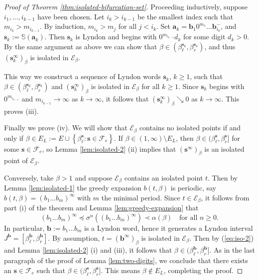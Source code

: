 \documentclass[12pt]{amsart}
\theoremstyle{definition}
\theoremstyle{remark}
\numberwithin{equation}{section}
\renewcommand{\S}{\ensuremath{\mathbb{S}}}
\renewcommand{\a}{ {\mathbf{a}}}
\renewcommand{\b}{ {\mathbf{b}}}
\newcommand{\s}{ {\mathbf{s}}}
\newcommand{\E}{\mathscr{E}}
\newcommand{\set}[1]{\left\{#1\right\}}
\newcommand{\f}{\infty}
\newcommand{\al}{\alpha}
\newcommand{\lle}{\preccurlyeq}
\renewcommand{\a}{ \mathbf{a}}
\newcommand{\si}{\sigma}
\begin{document}
{\begin{proof}[Proof of Theorem \ref{thm:isolated-bifurcation-set}]
Proceeding inductively, suppose $i_1,\dots,i_{k-1}$ have been chosen. Let $i_k>i_{k-1}$ be the smallest index such that $m_{i_k}>m_{i_{k-1}}$. By induction, $m_{i_k}>m_j$ for all $j<i_k$. Set $\a_k=\b_1 0^{m_1}\ldots \b_{i_k}^-$, and $\s_k:=\S(\a_k)$. Then $\s_k$ is Lyndon and begins with $0^{m_{i_{k-1}}}d_k$ for some digit $d_k>0$. By the same argument as above we can show that $\beta\in(\beta_\ell^{\s_k}, \beta_r^{\s_k})$, and thus $(\s_k^\f)_\beta$ is isolated in $\E_\beta$.

This way we construct a sequence of Lyndon words $\s_k$, $k\ge 1$, such that $\beta\in(\beta_\ell^{\s_k}, \beta_r^{\s_k})$ and $(\s_k^\f)_\beta$ is isolated in $\E_\beta$ for all $k\ge 1$. Since $\s_k$ begins with $0^{m_{i_{k-1}}}$ and $m_{i_{k-1}}\to\f$ as $k\to\f$, it follows that $(\s_k^\f)_\beta\searrow 0$ as $k\to\f$. This proves (iii).

Finally we prove (iv). We will show that ${\E_\beta}$ contains no isolated points if and only if $\beta\in E_L:=E\cup\set{\beta_\ell^\s: \s\in\mathcal F_e}$.
If $\beta\in(1,\f)\setminus E_L$, then $\beta\in(\beta_\ell^\s,\beta_r^\s]$ for some $\s\in\mathcal F_e$, so Lemma \ref{lem:isolated-2} (ii) implies that $(\s^\f)_\beta$ is an isolated point of $\E_\beta$. 

Conversely, take $\beta>1$ and suppose $\E_\beta$ contains an isolated point $t$. Then by Lemma \ref{lem:isolated-1} the greedy expansion $b(t,\beta)$ is periodic, say $b(t,\beta)=(b_1\ldots b_m)^\f$ with $m$ the minimal period. Since $t\in\E_\beta$, it follows from part (i) of the theorem and Lemma \ref{lem:greedy-expansion} that
   \begin{equation} \label{eq:iso-2}
   (b_1\ldots b_m)^\f\lle\si^n((b_1\ldots b_m)^\f)\prec\al(\beta)\quad\textrm{for all }n\ge 0.
   \end{equation} 
In particular, $\b:=b_1\ldots b_m$ is a Lyndon word, hence it generates a Lyndon interval $J^\b=[\beta_\ell^\b, \beta_r^\b]$. By assumption, $t=(\b^\f)_\beta$ is isolated in $\E_\beta$. Then by (\ref{eq:iso-2}) and Lemma \ref{lem:isolated-2} (i) and (iii), it follows that $\beta\in(\beta_\ell^\b, \beta_r^\b]$. As in the last paragraph of the proof of Lemma \ref{lem:two-digits}, we conclude that there exists an $\s\in\mathcal F_e$ such that $\beta\in(\beta_\ell^\s, \beta_r^\s]$. This means $\beta\notin E_L$, completing the proof.
\end{proof}


}
\end{document}
